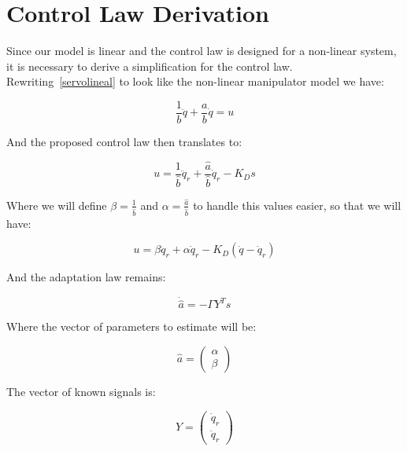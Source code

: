 \documentclass[journal]{IEEEtran}
\begin{document}
\section{Control Law Derivation}
    
    Since our model is linear and the control law is designed for a non-linear system, it is necessary to derive a simplification for the control law. Rewriting~\ref{servolineal} to look like the non-linear manipulator model we have:

    \begin{equation}
        \frac{1}{b} \ddot{q} + \frac{a}{b} \dot{q} = u
    \end{equation}

    And the proposed control law then translates to:

    \begin{equation*}
        u = \frac{1}{\hat{b}} \ddot{q}_r + \frac{\hat{a}}{\hat{b}} \dot{q}_r - K_D s
    \end{equation*}

    Where we will define $\beta = \frac{1}{\hat{b}}$ and $\alpha = \frac{\hat{a}}{\hat{b}}$ to handle this values easier, so that we will have:

    \begin{equation}
        u = \beta \ddot{q}_r + \alpha \dot{q}_r - K_D \left( \dot{q} - \dot{q}_r \right)
    \end{equation}

    And the adaptation law remains:

    \begin{equation*}
        \dot{\hat{a}} = - \Gamma Y^T s
    \end{equation*}

    Where the vector of parameters to estimate will be:

    \begin{equation}
        \hat{a} =
        \begin{pmatrix}
            \alpha \\
            \beta
        \end{pmatrix}
    \end{equation}

    The vector of known signals is:

    \begin{equation}
        Y =
        \begin{pmatrix}
            \dot{q}_r \\
            \ddot{q}_r
        \end{pmatrix}
    \end{equation}
\end{document}
